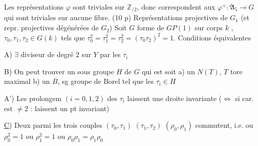 Les représentations $\varphi$ sont triviales sur $\mathbb Z_{/2}$,
donc correspondent  aux
$\varphi^+:\mathfrak A_5\longrightarrow G$ qui sont triviales sur
aucune fibre.
(10 p)
Représentations projectives
de $G_1$ (et repr. 
projectives dégénérées
de $G_2$)
 Soit $G$  forme de $GP(1)$ sur corps $k$ , $\tau_0,\tau_1,\tau_2\in G(k)$
tels que $\tau_0^2=\tau_1^2=\tau_2^2=(\tau_0\tau_2)^2=1$. Conditions équivalentes

A) $\exists$  diviseur de degré $2$ sur $Y$  par les $\tau_i$

\leavevmode{}B) On peut trouver un sous groupe  $H$ de $G$ qui est
soit \quad a) un $N(T)$, $T$ tore maximal
\hphantom{soit}\quad b) un $B$, sg groupe de Borel
tel que les $\tau_i\in H$

A') Les  prolongem   \deleted{\unsure{$\varphi$}} $(i=0,1,2)$
des $\tau_i$ laissent une droite invariante ($\Leftrightarrow$ si
car. est $\ne2$ : laissent un pt invariant)


\uline{C}) Deux parmi les trois couples $(\tau_0,\tau_1)$ $(\tau_1,\tau_2)$
$(\rho_0,\rho_1)$ commutent, i.e. ou $\rho_0^2=1$ ou $\rho_1^2=1$ ou $\rho_0\rho_1=\rho_1\rho_0$

